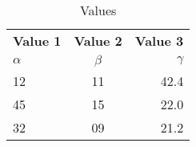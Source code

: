 \documentclass{article}
\begin{document}
\begin{table}[h!]
  \begin{center}
    \caption{Values}
    \label{tab:table1}
    \begin{tabular}{l|c|r} 
      \textbf{Value 1} & \textbf{Value 2} & \textbf{Value 3}\\
      $\alpha$ & $\beta$ & $\gamma$ \\
      \hline
      12 & 11 & 42.4\\
      45 & 15 & 22.0\\
      32 & 09 & 21.2\\
    \end{tabular}
  \end{center}
\end{table}
\end{document}
